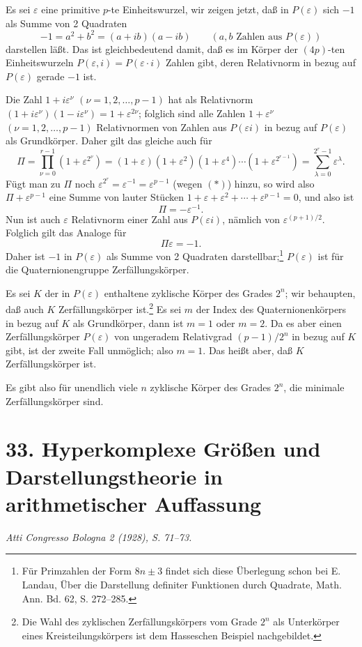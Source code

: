 \documentclass[11pt]{article}
\begin{document}
Es sei $\varepsilon$ eine primitive $p$-te Einheitswurzel, wir zeigen jetzt, daß in $P(\varepsilon)$ sich $-1$ als Summe von 2 Quadraten
\[
        -1=a^2+b^2=(a+ib)(a-ib)\qquad (a,b\text{ Zahlen aus }P(\varepsilon))
\]
darstellen läßt. Das ist gleichbedeutend damit, daß es im Körper der $(4p)$-ten Einheitswurzeln $P(\varepsilon,i)=P(\varepsilon\cdot i)$ Zahlen gibt, deren Relativnorm in bezug auf $P(\varepsilon)$ gerade $-1$ ist.

Die Zahl $1+i\varepsilon^\nu$ $(\nu=1,2,\ldots,p-1)$ hat als Relativnorm $(1+i\varepsilon^\nu)(1-i\varepsilon^\nu)=1+\varepsilon^{2\nu}$; folglich sind alle Zahlen $1+\varepsilon^\nu$ $(\nu=1,2,\ldots,p-1)$ Relativnormen von Zahlen aus $P(\varepsilon i)$ in bezug auf $P(\varepsilon)$ als Grundkörper. Daher gilt das gleiche auch für
\[
\Pi=\prod_{\nu=0}^{r-1}(1+\varepsilon^{2^\nu})
=(1+\varepsilon)(1+\varepsilon^2)(1+\varepsilon^4)\cdots(1+\varepsilon^{2^{r-1}})
=\sum_{\lambda=0}^{2^r-1}\varepsilon^\lambda.
\]
Fügt man zu $\Pi$ noch $\varepsilon^{2^r}=\varepsilon^{-1}=\varepsilon^{p-1}$ (wegen $(*)$) hinzu, so wird also $\Pi+\varepsilon^{p-1}$ eine Summe von lauter Stücken $1+\varepsilon+\varepsilon^2+\cdots+\varepsilon^{p-1}=0$, und also ist
\[
        \Pi=-\varepsilon^{-1}.
\]
Nun ist auch $\varepsilon$ Relativnorm einer Zahl aus $P(\varepsilon i)$, nämlich von $\varepsilon^{(p+1)/2}$. Folglich gilt das Analoge für
\[
        \Pi\varepsilon=-1.
\]
Daher ist $-1$ in $P(\varepsilon)$ als Summe von 2 Quadraten darstellbar;\footnote{Für Primzahlen der Form $8n\pm3$ findet sich diese Überlegung schon bei E. Landau, Über die Darstellung definiter Funktionen durch Quadrate, Math. Ann. Bd. 62, S. 272--285.} $P(\varepsilon)$ ist für die Quaternionengruppe Zerfällungskörper.

Es sei $K$ der in $P(\varepsilon)$ enthaltene zyklische Körper des Grades $2^n$; wir behaupten, daß auch $K$ Zerfällungskörper ist.\footnote{Die Wahl des zyklischen Zerfällungskörpers vom Grade $2^n$ als Unterkörper eines Kreisteilungskörpers ist dem Hasseschen Beispiel nachgebildet.} Es sei $m$ der Index des Quaternionenkörpers in bezug auf $K$ als Grundkörper, dann ist $m=1$ oder $m=2$. Da es aber einen Zerfällungskörper $P(\varepsilon)$ von ungeradem Relativgrad $(p-1)/2^n$ in bezug auf $K$ gibt, ist der zweite Fall unmöglich; also $m=1$. Das heißt aber, daß $K$ Zerfällungskörper ist.

Es gibt also für unendlich viele $n$ zyklische Körper des Grades $2^n$, die minimale Zerfällungskörper sind.

\section*{33. Hyperkomplexe Größen und Darstellungstheorie in arithmetischer Auffassung}
\emph{Atti Congresso Bologna 2 (1928), S. 71--73.}
\end{document}
